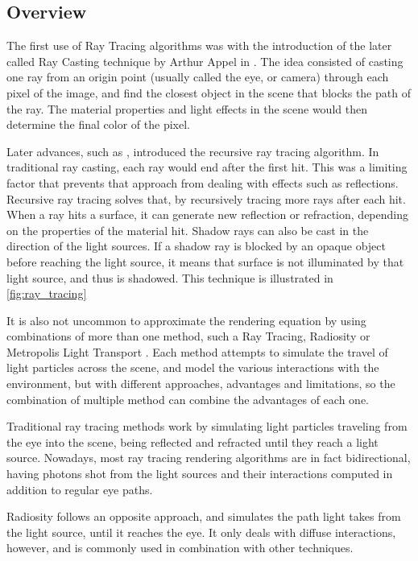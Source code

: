 \documentclass[main.tex]{subfiles}
\begin{document}
\subsection{Overview}

The first use of Ray Tracing algorithms was with the introduction of the later called Ray Casting technique by Arthur Appel in \cite{appel1968some}. The idea consisted of casting one ray from an origin point (usually called the eye, or camera) through each pixel of the image, and find the closest object in the scene that blocks the path of the ray. The material properties and light effects in the scene would then determine the final color of the pixel.

Later advances, such as \cite{whitted2005improved}, introduced the recursive ray tracing algorithm. In traditional ray casting, each ray would end after the first hit. This was a limiting factor that prevents that approach from dealing with effects such as reflections. Recursive ray tracing solves that, by recursively tracing more rays after each hit. When a ray hits a surface, it can generate new reflection or refraction, depending on the properties of the material hit. Shadow rays can also be cast in the direction of the light sources. If a shadow ray is blocked by an opaque object before reaching the light source, it means that surface is not illuminated by that light source, and thus is shadowed. This technique is illustrated in \cref{fig:ray_tracing}


It is also not uncommon to approximate the rendering equation by using combinations of more than one method, such a Ray Tracing, Radiosity or Metropolis Light Transport \cite{wallace1987two,veach1997metropolis}. Each method attempts to simulate the travel of light particles across the scene, and model the various interactions with the environment, but with different approaches, advantages and limitations, so the combination of multiple method can combine the advantages of each one.

Traditional ray tracing methods work by simulating light particles traveling from the eye into the scene, being reflected and refracted until they reach a light source. Nowadays, most ray tracing rendering algorithms are in fact bidirectional, having photons shot from the light sources and their interactions computed in addition to regular eye paths.

Radiosity follows an opposite approach, and simulates the path light takes from the light source, until it reaches the eye. It only deals with diffuse interactions, however, and is commonly used in combination with other techniques.
\end{document}
